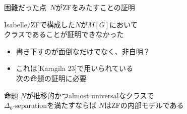 \documentclass[17pt]{beamer}
\begin{document}
\begin{frame}{困難だった点\, {\normalsize $N$がZFをみたすことの証明}}
    \vspace{-1pt}
    {\small 
    Isabelle/ZFで構成した$N$が$M[G]$において\\
    クラスであることが証明できなかった
    \begin{itemize}[left=0.1cm,itemsep=8pt]
        \item 書き下すのが面倒なだけでなく、非自明？
        \item これは[Karagila 23]で用いられている\\
        次の命題の証明に必要
    \end{itemize}
    \vspace{-0.2cm}
    \begin{itembox}[l]{命題}
        {\small
            $N$が推移的かつalmost universalなクラスで\\
            $\Delta_0$-separationを満たすならば
            $N$はZFの内部モデルである
        }
    \end{itembox} 
    }
\end{frame}
\end{document}
